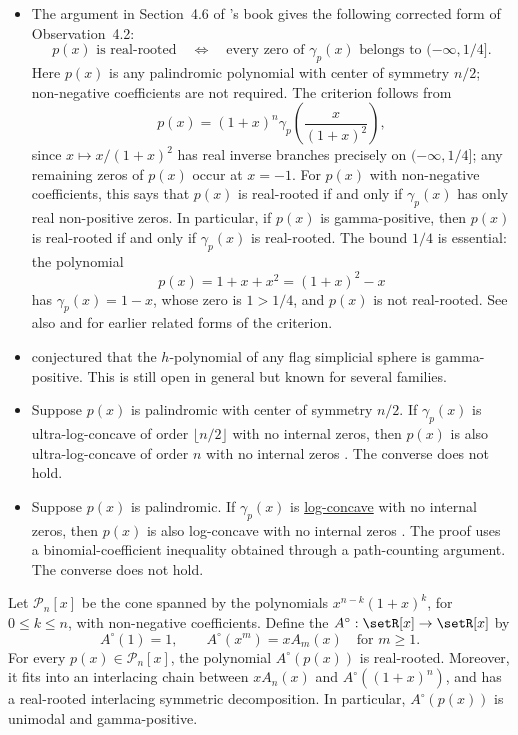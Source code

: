\begin{itemize}

\item The argument in Section~4.6 of 's book
\cite[Section~4.6]{Petersen2015EulerianNumbers} gives the following corrected
form of Observation~4.2:
\[
  p(x) \text{ is real-rooted}
  \quad\Longleftrightarrow\quad
  \text{every zero of }\gamma_p(x)\text{ belongs to }(-\infty,1/4].
\]
Here $p(x)$ is any palindromic polynomial with center of symmetry $n/2$;
non-negative coefficients are not required.  The criterion follows from
\[
  p(x)=(1+x)^n\gamma_p\!\left(\frac{x}{(1+x)^2}\right),
\]
since $x\mapsto x/(1+x)^2$ has real inverse branches precisely on
$(-\infty,1/4]$; any remaining zeros of $p(x)$ occur at $x=-1$.
For $p(x)$ with non-negative coefficients, this says that $p(x)$ is
real-rooted if and only if $\gamma_p(x)$ has only real non-positive zeros.
In particular, if $p(x)$ is gamma-positive, then $p(x)$ is real-rooted if
and only if $\gamma_p(x)$ is real-rooted.  The bound $1/4$ is essential: the
polynomial
\[
  p(x)=1+x+x^2=(1+x)^2-x
\]
has $\gamma_p(x)=1-x$, whose zero is $1\gt 1/4$, and $p(x)$ is not real-rooted.
See also \cite[Lemma~4.1]{Branden2004Poset} and
\cite[Remark~3.1.1]{Gal2005} for earlier related forms of the criterion.

\item {} conjectured \cite{Gal2005} that the
$h$-polynomial of any flag simplicial sphere is gamma-positive.
This is still open in general but known for several families.

\item Suppose $p(x)$ is palindromic with center of symmetry $n/2$.
If $\gamma_p(x)$ is ultra-log-concave of order $\lfloor n/2 \rfloor$ with no
internal zeros, then $p(x)$ is also ultra-log-concave of order $n$ with no
internal zeros \cite{BrandenFerroniJochemko2024x}.
The converse does not hold.

\item Suppose $p(x)$ is palindromic.
If $\gamma_p(x)$ is \hyperref[logConcavePolynomial]{log-concave} with no
internal zeros, then $p(x)$ is also log-concave with no internal zeros
\cite{FerroniPanovaVenturello2025x}.
The proof uses a binomial-coefficient inequality obtained through a
path-counting argument.  The converse does not hold.

\end{itemize}

\begin{theorem}
Let $\mathcal{P}_n[x]$ be the cone spanned by the polynomials
$x^{n-k}(1+x)^k$, for $0\leq k\leq n$, with non-negative coefficients.
Define the  $A^\circ:\setR[x]\to\setR[x]$ by
\[
  A^\circ(1)=1,\qquad A^\circ(x^m)=xA_m(x) \quad \text{for } m\geq 1.
\]
For every $p(x)\in \mathcal{P}_n[x]$, the polynomial $A^\circ(p(x))$
is real-rooted.  Moreover, it fits into an interlacing chain between
$xA_n(x)$ and $A^\circ((1+x)^n)$, and has a real-rooted interlacing
symmetric decomposition.  In particular, $A^\circ(p(x))$ is unimodal
and gamma-positive.
\end{theorem}


